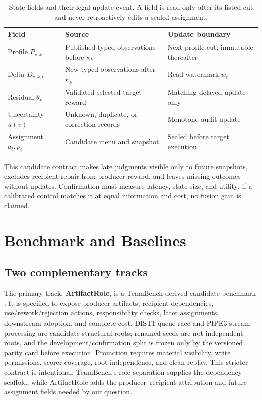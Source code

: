 \documentclass[sigconf,anonymous]{aamas}
\begin{document}
\begin{table}[t]
\centering\scriptsize
\setlength{\tabcolsep}{2pt}
\caption{State fields and their legal update event. A field is read only after its listed cut and never retroactively edits a sealed assignment.}
\label{tab:state-contract}
\begin{tabular}{p{}p{}p{}}
\toprule
Field & Source & Update boundary \\
\midrule
Profile $P_{v,k}$ & Published typed observations before $\kappa_k$ & Next profile cut; immutable thereafter \\
Delta $D_{v,k,t}$ & New typed observations after $\kappa_k$ & Read watermark $w_t$ \\
Residual $\theta_v$ & Validated selected target reward & Matching delayed update only \\
Uncertainty $u(v)$ & Unknown, duplicate, or correction records & Monotone audit update \\
Assignment $a_t,p_t$ & Candidate menu and snapshot & Sealed before target execution \\
\bottomrule
\end{tabular}
\end{table}

This candidate contract makes late judgments visible only to future snapshots, excludes recipient repair from producer reward, and leaves missing outcomes without updates. Confirmation must measure latency, state size, and utility; if a calibrated control matches it at equal information and cost, no fusion gain is claimed.

\section{Benchmark and Baselines}
\label{sec:benchmark}

\subsection{Two complementary tracks}
The primary track, \textbf{ArtifactRole}, is a TeamBench-derived candidate benchmark \cite{kim2026teambench}. It is specified to expose producer artifacts, recipient dependencies, use/rework/rejection actions, responsibility checks, later assignments, downstream adoption, and complete cost. DIST1 queue-race and PIPE3 stream-processing are candidate structural roots; renamed seeds are not independent roots, and the development/confirmation split is frozen only by the versioned parity card before execution. Promotion requires material visibility, write permissions, scorer coverage, root independence, and clean replay. This stricter contract is intentional: TeamBench's role separation supplies the dependency scaffold, while ArtifactRole adds the producer--recipient attribution and future-assignment fields needed by our question.
\end{document}
